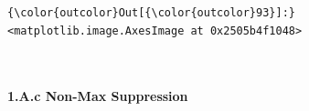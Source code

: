 \documentclass[11pt]{article}
\begin{document}
\begin{Verbatim}[commandchars=\\\{\}]
{\color{outcolor}Out[{\color{outcolor}93}]:} <matplotlib.image.AxesImage at 0x2505b4f1048>
\end{Verbatim}
            
    \begin{center}
    \end{center}
    { \hspace*{\fill} \\}
    
    \hypertarget{a.c-non-max-suppression}{%
\paragraph{1.A.c Non-Max Suppression}\label{a.c-non-max-suppression}}
\end{document}

